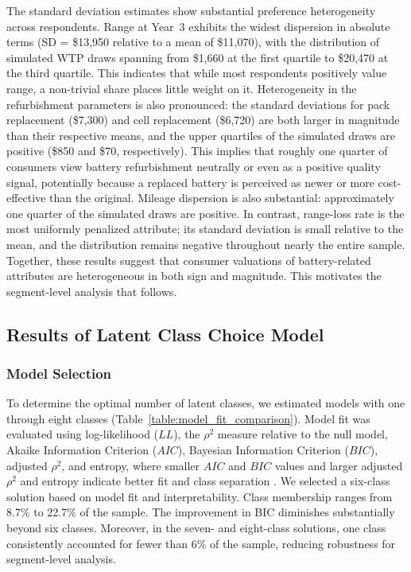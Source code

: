 \documentclass[a4paper,fleqn]{cas-sc}   %
\begin{document}
The standard deviation estimates show substantial preference heterogeneity across respondents. Range at Year~3 exhibits the widest dispersion in absolute terms (SD = \$13,950 relative to a mean of \$11,070), with the distribution of simulated WTP draws spanning from \$1,660 at the first quartile to \$20,470 at the third quartile. This indicates that while most respondents positively value range, a non-trivial share places little weight on it. Heterogeneity in the refurbishment parameters is also pronounced: the standard deviations for pack replacement (\$7,300) and cell replacement (\$6,720) are both larger in magnitude than their respective means, and the upper quartiles of the simulated draws are positive (\$850 and \$70, respectively). This implies that roughly one quarter of consumers view battery refurbishment neutrally or even as a positive quality signal, potentially because a replaced battery is perceived as newer or more cost-effective than the original. Mileage dispersion is also substantial: approximately one quarter of the simulated draws are positive. In contrast, range-loss rate is the most uniformly penalized attribute; its standard deviation is small relative to the mean, and the distribution remains negative throughout nearly the entire sample. Together, these results suggest that consumer valuations of battery-related attributes are heterogeneous in both sign and magnitude. This motivates the segment-level analysis that follows.



\subsection{Results of Latent Class Choice Model}
\subsubsection{Model Selection}

To determine the optimal number of latent classes, we estimated models with one through eight classes (Table~\ref{table:model_fit_comparison}). Model fit was evaluated using log-likelihood ($LL$), the $\rho^2$ measure relative to the null model, Akaike Information Criterion ($AIC$), Bayesian Information Criterion ($BIC$), adjusted $\rho^2$, and entropy, where smaller $AIC$ and $BIC$ values and larger adjusted $\rho^2$ and entropy indicate better fit and class separation \parencite{nylundDecidingNumberClasses2007}. We selected a six-class solution based on model fit and interpretability. Class membership ranges from 8.7\% to 22.7\% of the sample. The improvement in BIC diminishes substantially beyond six classes. Moreover, in the seven- and eight-class solutions, one class consistently accounted for fewer than 6\% of the sample, reducing robustness for segment-level analysis. 
\end{document}

